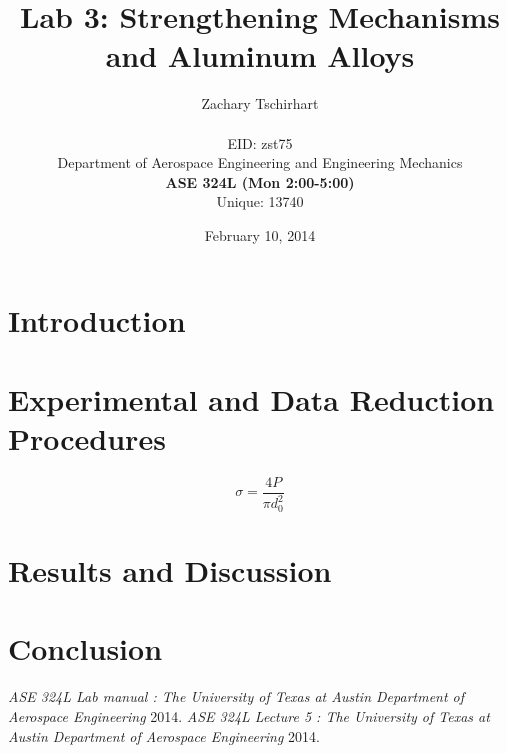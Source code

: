 \documentclass[12pt]{report}
\title{Lab 3: Strengthening Mechanisms and Aluminum Alloys}
\author{Zachary Tschirhart \\
	\small \\
        \small EID: zst75 \\
	\small Department of Aerospace Engineering and Engineering Mechanics \\
	\small \textbf{ASE 324L (Mon 2:00-5:00)} \\
	\small Unique: 13740}
\date{February 10, 2014}
\begin{document}
\maketitle

\begin{abstract}

\end{abstract}


\tableofcontents
\pagebreak

\setcounter{secnumdepth}{0}



\section{Introduction}
\doublespacing



\section{Experimental and Data Reduction Procedures}


\begin{equation}
        \sigma = \frac{4P}{\pi d_0^2}
	\label{equation:equation1}
\end{equation}


\section{Results and Discussion}
\doublespacing


\section{Conclusion}
\doublespacing



\begin{thebibliography}{0}
 {\em ASE 324L Lab manual : The University of Texas at Austin Department of Aerospace Engineering}  2014.
 {\em ASE 324L Lecture 5 : The University of Texas at Austin Department of Aerospace Engineering}  2014.
\end{thebibliography}
\end{document}
